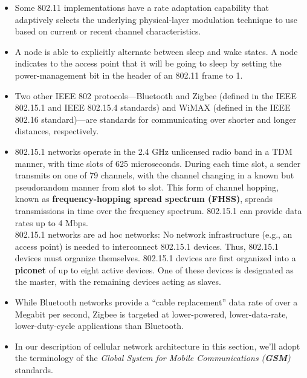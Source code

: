 \begin{itemize}
\item
Some 802.11 implementations have a rate adaptation capability that adaptively selects the underlying physical-layer modulation technique to use based on current or recent channel characteristics.

\item
A node is able to explicitly alternate between sleep and wake states. A node indicates to the access point that it will be going to sleep by setting the power-management bit in the header of an 802.11 frame to 1.

\item
Two other IEEE 802 protocols---Bluetooth and Zigbee (defined in the IEEE 802.15.1 and IEEE 802.15.4 standards) and WiMAX (defined in the IEEE 802.16 standard)---are standards for communicating over shorter and longer distances, respectively.

\item
802.15.1 networks operate in the 2.4 GHz unlicensed radio band in a TDM manner, with time slots of 625 microseconds. During each time slot, a sender transmits on one of 79 channels, with the channel changing in a known but pseudorandom manner from slot to slot. This form of channel hopping, known as \textbf{frequency-hopping spread spectrum (FHSS)}, spreads transmissions in time over the frequency spectrum. 802.15.1 can provide data rates up to 4 Mbps.\\
802.15.1 networks are ad hoc networks: No network infrastructure (e.g., an access point) is needed to interconnect 802.15.1 devices. Thus, 802.15.1 devices must organize themselves. 802.15.1 devices are first organized into a \textbf{piconet} of up to eight active devices. One of these devices is designated as the master, with the remaining devices acting as slaves.

\item
While Bluetooth networks provide a ``cable replacement'' data rate of over a Megabit per second, Zigbee is targeted at lower-powered, lower-data-rate, lower-duty-cycle applications than Bluetooth.

\item
In our description of cellular network architecture in this section, we'll adopt the terminology of the \textit{Global System for Mobile Communications (\textbf{GSM})} standards.


\end{itemize}
